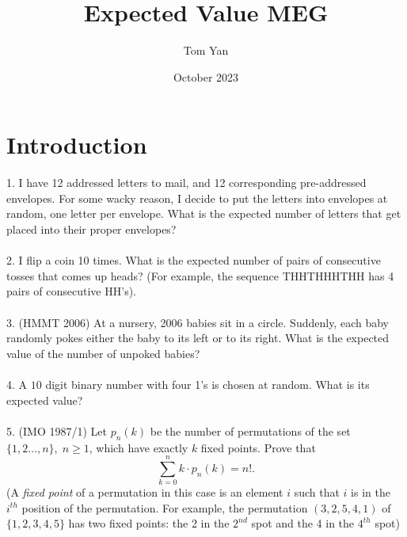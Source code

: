 \documentclass{article}
\title{Expected Value MEG}
\author{Tom Yan}
\date{October 2023}
\begin{document}
\maketitle

\section{Introduction}
1. I have 12 addressed letters to mail, and 12 corresponding pre-addressed envelopes. For some wacky reason, I decide to put the letters into envelopes at random, one letter per envelope. What is the expected number of letters that get placed into their proper envelopes?  \\\\
2. I flip a coin 10 times. What is the expected number of pairs of consecutive tosses that comes up heads? (For example, the sequence THHTHHHTHH has 4 pairs of consecutive HH's).  \\\\
3. (HMMT 2006) At a nursery, 2006 babies sit in a circle. Suddenly, each baby randomly pokes either the baby to its left or to its right. What is the expected value of the number of unpoked babies?  \\\\
4. A $10$ digit binary number with four 1's is chosen at random. What is its expected value?\\\\
5. (IMO 1987/1) Let $p_n(k)$ be the number of permutations of the set $\{ 1, 2 \ldots , n \} , \; n \ge 1$, which have exactly $k$ fixed points. Prove that $$\sum_{k=0}^{n} k \cdot p_n (k) = n!.$$ (A \emph{fixed point} of a permutation in this case is an element $i$ such that $i$ is in the $i^{th}$ position of the permutation. For example, the permutation $(3,2,5,4,1)$ of $\{1,2,3,4,5\}$ has two fixed points: the 2 in the $2^{nd}$ spot and the 4 in the $4^{th}$ spot)

\newpage
\end{document}
